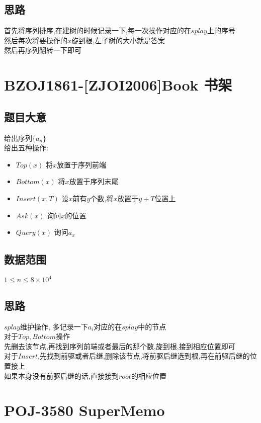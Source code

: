 \documentclass{ctexart}
\numberwithin{equation}{section}
\begin{document}
\begin{flushleft}
  \subsection{思路}
  首先将序列排序,在建树的时候记录一下,每一次操作对应的在$splay$上的序号\\
  然后每次将要操作的$x$旋到根,左子树的大小就是答案\\
  然后再序列翻转一下即可\\
  \newpage

  \section{BZOJ1861-[ZJOI2006]Book 书架}
  \subsection{题目大意}
  给出序列$\{a_n\}$\\
  给出五种操作:\\
  \begin{itemize}
  \item $Top(x)$ 将$x$放置于序列前端
  \item $Bottom(x)$ 将$x$放置于序列末尾
  \item $Insert(x,T)$ 设$x$前有$y$个数,将$x$放置于$y+T$位置上
  \item $Ask(x)$ 询问$x$的位置
  \item $Query(x)$ 询问$a_x$
  \end{itemize}
  \subsection{数据范围}
  $1\le n \le 8\times 10^4$
  \subsection{思路}
  $splay$维护操作, 多记录一下$a_i$对应的在$splay$中的节点\\
  对于$Top,Bottom$操作\\
  先删去该节点,再找到序列前端或者最后的那个数,旋到根,接到相应位置即可\\
  对于$Insert$,先找到前驱或者后继,删除该节点,将前驱后继选到根,再在前驱后继的位置接上\\
  如果本身没有前驱后继的话,直接接到$root$的相应位置\\
  \newpage

  \section{POJ-3580 SuperMemo}

\end{flushleft}
\end{document}
